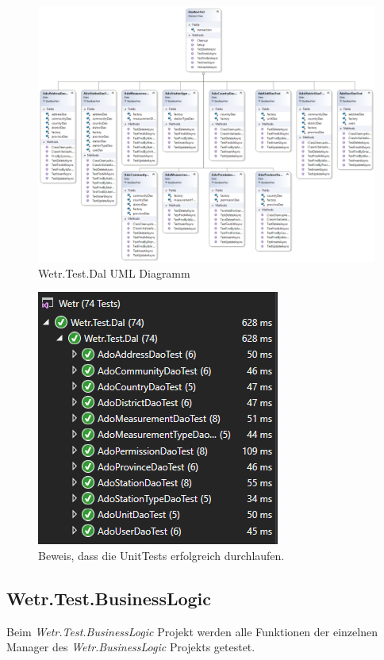 \begin{figure}[H]
\centering
\includegraphics[width=\textwidth]{pictures/Wetr_Test_Dal.png}
\caption{Wetr.Test.Dal UML Diagramm}
\label{fig:Wetr.Test.Dal}
\end{figure}
\raggedright

\begin{figure}[H]
\centering
\includegraphics[width=.4\textwidth]{pictures/green_tests.png}
\caption{Beweis, dass die UnitTests erfolgreich durchlaufen.}
\label{fig:Wetr.Test.Dal}
\end{figure}
\raggedright

\newpage
\subsection{Wetr.Test.BusinessLogic}
Beim \textit{Wetr.Test.BusinessLogic} Projekt werden alle Funktionen der einzelnen Manager des \textit{Wetr.BusinessLogic} Projekts getestet.


